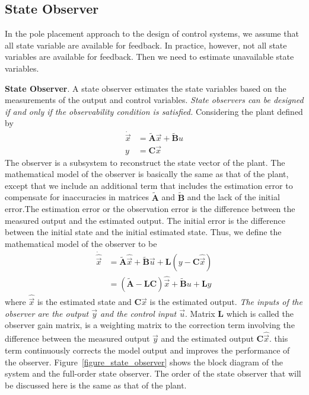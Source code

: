 \documentclass[12pt,a4paper,oneside]{book}
\begin{document}
\begin{onehalfspace}
\section{State Observer} 
In the pole placement approach to the design of control systems, we assume that 
all state variable are available for feedback. In practice, however, not all 
state variables are available for feedback. Then we need to estimate 
unavailable state variables.

\vspace{5mm}
\textbf{State Observer}. A state observer estimates the state variables based 
on the measurements of the output and control variables. \textit{State 
observers can be designed if and only if the observability condition is 
satisfied.}
Considering the plant defined by
\begin{equation} \label{state_observer_1}
	\begin{split}
		\dot{\vec x} & = \tilde{\mathbf{A}}\vec{x} + \tilde{\mathbf{B}}u \\[6pt]
		y & = \mathbf{C}\vec{x}
	\end{split}
\end{equation}
The observer is a subsystem to reconstruct the state vector of the plant. The 
mathematical model of the observer is basically the same as that of the plant, 
except that we include an additional term that includes the estimation error to 
compensate for inaccuracies in matrices $\tilde{\mathbf{A}}$ and 
$\tilde{\mathbf{B}}$ and the lack of the initial error.The estimation error or 
the observation error is the difference between the measured output and the 
estimated output. The initial error is the difference between the initial state 
and the initial estimated state. Thus, we define the mathematical model of the 
observer to be
\begin{equation} \label{state_observer_2}
	\begin{split}
		\dot{\hat{\vec{x}}} & = \tilde{\mathbf{A}}\hat{\vec x} + 
		\tilde{\mathbf{B}}\vec u + \mathbf{L}(y - \mathbf{C}\hat{\vec x}) 
		\\
		& = (\tilde{\mathbf{A}}-\mathbf{L}\mathbf{C})\hat{\vec x} + 
		\tilde{\mathbf{B}}u + \mathbf{L}y
	\end{split}
\end{equation}
where $\hat{\vec x}$ is the estimated state and $\mathbf{C}\hat{\vec x}$ is the 
estimated output. \textit{The inputs of the observer are the output $\vec y$ 
and the control input $\vec u$}. Matrix $\mathbf{L}$ which is called the 
observer gain matrix, is a weighting matrix to the correction term involving 
the difference between the measured output $\vec y$ and the estimated output 
$\mathbf{C}\hat{\vec x}$. this term continuously corrects the model output and 
improves 
the performance of the observer. Figure~\ref{figure_state_observer} shows the 
block diagram of the system and the full-order state observer.
The order of the state observer that will be discussed here is the same as that 
of the plant.


\end{onehalfspace}
\end{document}
